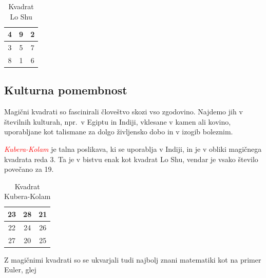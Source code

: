 \documentclass[a4paper,12pt]{article}
\theoremstyle{plain}
\theoremstyle{definition}
\begin{document}
\begin{table}[h!]
   \centering
   \caption{Kvadrat Lo Shu}
   \label{loshu}
   \begin{tabular}{|c|c|c|}
      \hline
      4 & 9 & 2 \\\hline
      3 & 5 & 7 \\\hline
      8 & 1 & 6 \\\hline
      \end{tabular}
\end{table}

\subsection{Kulturna pomembnost}

Magični kvadrati so fascinirali človeštvo skozi vso zgodovino. Najdemo jih
v številnih kulturah, npr.\ v Egiptu in Indiji, vklesane v kamen ali
kovino, uporabljane kot talismane za dolgo življensko dobo in v
izogib boleznim.

\textcolor{red}{\emph{Kubera-Kolam}} je talna poslikava, ki se uporablja v Indiji, in je v
obliki magičnega kvadrata reda 3. Ta je v bistvu enak kot kvadrat
Lo Shu, vendar je vsako število povečano za 19.

\begin{table}[h!]
   \centering
   \caption{Kvadrat Kubera-Kolam}
   \label{kubera}
   \begin{tabular}{|c|c|c|}
      \hline
      23 & 28 & 21 \\ \hline
      22 & 24 & 26 \\ \hline
      27 & 20 & 25 \\ \hline
   \end{tabular}
\end{table}

      Z magičnimi kvadrati so se ukvarjali tudi najbolj znani matematiki kot na
primer Euler, glej \cite{euler}
\end{document}

